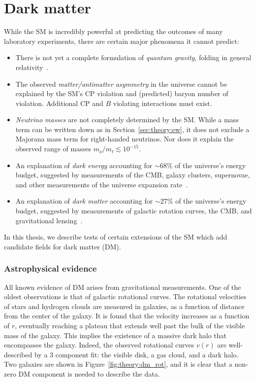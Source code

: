 \section{Dark matter}

While the SM is incredibly powerful at predicting the outcomes of many laboratory experiments, there are certain major phenomena it cannot predict:
\begin{itemize}
    \item There is not yet a complete formulation of \emph{quantum gravity}, folding in general relativity~\cite{gr}.
    \item The observed \emph{matter/antimatter asymmetry} in the universe cannot be explained by the SM's CP violation and (predicted) baryon number of violation. 
          Additional CP and $B$ violating interactions must exist.
    \item \emph{Neutrino masses} are not completely determined by the SM. 
            While a mass term can be written down as in Section~\ref{sec:theory:ew}, it does not exclude a Majorana mass term for right-handed neutrinos. 
            Nor does it explain the observed range of masses $m_\nu/m_t \lesssim 10^{-15}$. 
    \item An explanation of \emph{dark energy} accounting for $\sim 68\%$ of the universe's energy budget, suggested by measurements of the CMB, galaxy clusters, supernovae, and other measurements of the universe expansion rate~\cite{darkenergy}.
    \item An explanation of \emph{dark matter} accounting for $\sim 27\%$ of the universe's energy budget, suggested by measurements of galactic rotation curves, the CMB, and gravitational lensing~\cite{pdg,dm1,dm2,dm3}.
\end{itemize}
In this thesis, we describe tests of certain extensions of the SM which add candidate fields for dark matter (DM). 

\subsubsection{Astrophysical evidence}
All known evidence of DM arises from gravitational measurements.
One of the oldest observations is that of galactic rotational curves.
The rotational velocities of stars and hydrogen clouds are measured in galaxies, as a function of distance from the center of the galaxy.
It is found that the velocity increases as a function of $r$, eventually reaching a plateau that extends well past the bulk of the visible mass of the galaxy.
This implies the existence of a massive dark halo that encompasses the galaxy.
Indeed, the observed rotational curves $v(r)$ are well-described by a 3 component fit: the visible disk, a gas cloud, and a dark halo. 
Two galaxies are shown in Figure~\ref{fig:theory:dm_rot}, and it is clear that a non-zero DM component is needed to describe the data.

